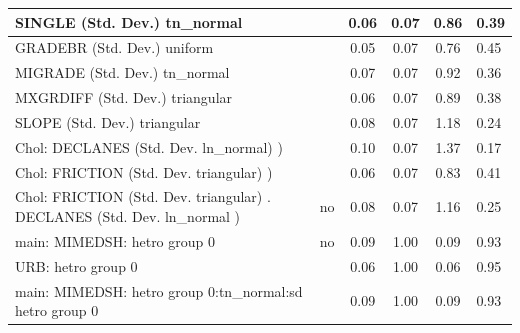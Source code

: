 \begin{table}
\begin{center}
\begin{tabular}{|l|l|c|c|c|l|}
			\hline
			SINGLE (Std. Dev.) tn_normal &  & 0.06 & 0.07 & 0.86 & 0.39 \\
			\hline
			GRADEBR (Std. Dev.) uniform &  & 0.05 & 0.07 & 0.76 & 0.45 \\
			\hline
			MIGRADE (Std. Dev.) tn_normal &  & 0.07 & 0.07 & 0.92 & 0.36 \\
			\hline
			MXGRDIFF (Std. Dev.) triangular &  & 0.06 & 0.07 & 0.89 & 0.38 \\
			\hline
			SLOPE (Std. Dev.) triangular &  & 0.08 & 0.07 & 1.18 & 0.24 \\
			\hline
			 Chol: DECLANES (Std. Dev. ln_normal) ) &  & 0.10 & 0.07 & 1.37 & 0.17 \\
			\hline
			 Chol: FRICTION (Std. Dev. triangular) ) &  & 0.06 & 0.07 & 0.83 & 0.41 \\
			\hline
			 Chol: FRICTION (Std. Dev. triangular) . DECLANES (Std. Dev.   ln_normal ) & no & 0.08 & 0.07 & 1.16 & 0.25 \\
			\hline
			main: MIMEDSH: hetro group 0 & no & 0.09 & 1.00 & 0.09 & 0.93 \\
			\hline
			URB: hetro group 0 &  & 0.06 & 1.00 & 0.06 & 0.95 \\
			\hline
			main: MIMEDSH: hetro group 0:tn_normal:sd  hetro group 0 &  & 0.09 & 1.00 & 0.09 & 0.93 \\
			\hline
		\end{tabular}
	\end{center}
\end{table}